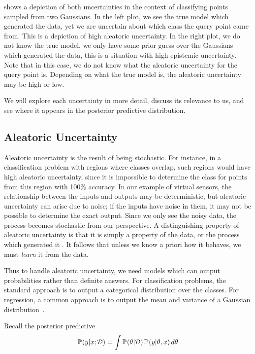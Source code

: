 \documentclass[../main.tex]{subfiles}
\begin{document}
 shows a depiction of both uncertainties in the context of classifying points sampled from two Gaussians. In the left plot, we see the true model which generated the data, yet we are uncertain about which class the query point came from. This is a depiction of high aleatoric uncertainty. 
In the right plot, we do not know the true model, we only have some prior guess over the Gaussians which generated the data, this is a situation with high epistemic uncertainty. Note that in this case, we do not know what the aleatoric uncertainty for the query point is. Depending on what the true model is, the aleatoric uncertainty may be high or low. 

We will explore each uncertainty in more detail, discuss its relevance to us, and see where it appears in the posterior predictive distribution. 


\subsection{Aleatoric Uncertainty}
\label{subsec:aleatoric}
Aleatoric uncertainty is the result of  being stochastic. For instance, in a classification problem with regions where classes overlap, such regions would have high aleatoric uncertainty, since it is impossible to determine the class for points from this region with 100\% accuracy. In our example of virtual sensors, the relationship between the inputs and outputs may be deterministic, but aleatoric uncertainty can arise due to noise; if the inputs have noise in them, it may not be possible to determine the exact output. Since we only see the noisy data, the process becomes stochastic from our perspective.
A distinguishing property of aleatoric uncertainty is that it is simply a property of the data, or the process which generated it . It follows that unless we know a priori how it behaves, we must \emph{learn} it from the data. 

Thus to handle aleatoric uncertainty, we need models which can output probabilities rather than definite answers. For classification problems, the standard approach is to output a categorical distribution over the classes. For regression, a common approach is to output the mean and variance of a Gaussian distribution~\citep{kendall2017uncertainties, goodfellow2016deep}. 

Recall the posterior predictive 
$$
    \mathbb{P}_{}(y|x; \mathcal{D})=  \int \mathbb{P}_{}(\theta | \mathcal{D})\, \mathbb{P}_{}(y|\theta, x) \, d\theta
$$
\end{document}
